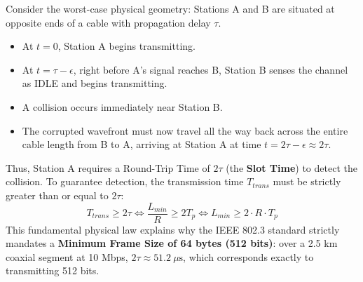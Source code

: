 \documentclass[12pt, a4paper]{article}
\begin{document}
Consider the worst-case physical geometry: Stations A and B are situated at opposite ends of a cable with propagation delay $\tau$.
\begin{itemize}
    \item At $t = 0$, Station A begins transmitting.
    \item At $t = \tau - \epsilon$, right before A's signal reaches B, Station B senses the channel as IDLE and begins transmitting.
    \item A collision occurs immediately near Station B.
    \item The corrupted wavefront must now travel all the way back across the entire cable length from B to A, arriving at Station A at time $t = 2\tau - \epsilon \approx 2\tau$.
\end{itemize}
Thus, Station A requires a Round-Trip Time of $2\tau$ (the \textbf{Slot Time}) to detect the collision. To guarantee detection, the transmission time $T_{trans}$ must be strictly greater than or equal to $2\tau$:
\begin{equation}
    T_{trans} \ge 2\tau \iff \frac{L_{min}}{R} \ge 2 T_p \iff L_{min} \ge 2 \cdot R \cdot T_p
\end{equation}
This fundamental physical law explains why the IEEE 802.3 standard strictly mandates a \textbf{Minimum Frame Size of 64 bytes (512 bits)}: over a 2.5 km coaxial segment at 10 Mbps, $2\tau \approx 51.2\ \mu\text{s}$, which corresponds exactly to transmitting 512 bits.
\end{document}
